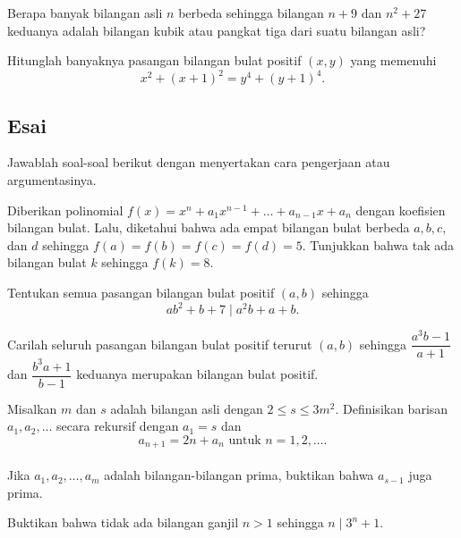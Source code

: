 \documentclass[12pt]{scrartcl}
\begin{document}
	\begin{soalbaru}
		Berapa banyak bilangan asli $n$ berbeda sehingga bilangan $n+9$ dan $n^2+27$ keduanya adalah bilangan kubik atau pangkat tiga dari suatu bilangan asli?
	\end{soalbaru}

	\begin{soalbaru}
		Hitunglah banyaknya pasangan bilangan bulat positif $(x,y)$ yang memenuhi\\[-20pt] $$x^2+(x+1)^2=y^4+(y+1)^4.$$
	\end{soalbaru}
	\newpage

\subsection{Esai}
Jawablah soal-soal berikut dengan menyertakan cara pengerjaan atau argumentasinya.
	
	\begin{soalbaru} 
		Diberikan polinomial $f(x)=x^n+a_1x^{n-1}+\dots+a_{n-1}x+a_n$ dengan koefisien bilangan bulat. Lalu, diketahui bahwa ada empat bilangan bulat berbeda $a,b,c,$ dan $d$ sehingga $f(a)=f(b)=f(c)=f(d)=5$. Tunjukkan bahwa tak ada bilangan bulat $k$ sehingga $f(k)=8$.
		
	\end{soalbaru}
	
	\begin{soalbaru} Tentukan semua pasangan bilangan bulat positif $(a,b)$ sehingga\\[-18pt] $$ab^2+b+7 \mid a^2b+a+b.$$
	\end{soalbaru}
	\begin{soalbaru} 
		Carilah seluruh pasangan bilangan bulat positif terurut $(a,b)$ sehingga $\dfrac{a^3b-1}{a+1}$ dan $\dfrac{b^3a+1}{b-1}$ keduanya merupakan bilangan bulat positif.
	\end{soalbaru}
	
	\begin{soalbaru}
		Misalkan $m$ dan $s$ adalah bilangan asli dengan $2 \le s \le 3m^2.$ Definisikan barisan $a_1,a_2,\dots$ secara rekursif dengan $a_1=s$ dan \\[-18pt]$$a_{n+1} = 2n + a_n \text{    untuk   }  n=1,2,\dots.$$\\[-23pt]
		Jika $a_1,a_2,\dots,a_m$ adalah bilangan-bilangan prima, buktikan bahwa $a_{s-1}$ juga prima. 
	\end{soalbaru}
	
	\begin{soalbaru}
		Buktikan bahwa tidak ada bilangan ganjil $n > 1$ sehingga $n \mid 3^n+1$.
	\end{soalbaru}
	
\end{document}
